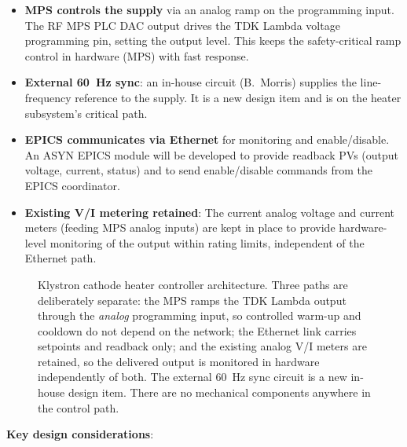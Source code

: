 \begin{itemize}
\tightlist
\item
  \textbf{MPS controls the supply} via an analog ramp on the programming input. The RF MPS PLC DAC output drives the TDK Lambda voltage programming pin, setting the output level. This keeps the safety-critical ramp control in hardware (MPS) with fast response.
\item
  \textbf{External \qty{60}{\hertz} sync}: an in-house circuit (B.~Morris) supplies the line-frequency reference to the supply. It is a new design item and is on the heater subsystem's critical path.
\item
  \textbf{EPICS communicates via Ethernet} for monitoring and enable/disable. An ASYN EPICS module will be developed to provide readback PVs (output voltage, current, status) and to send enable/disable commands from the EPICS coordinator.
\item
  \textbf{Existing V/I metering retained}: The current analog voltage and current meters (feeding MPS analog inputs) are kept in place to provide hardware-level monitoring of the output within rating limits, independent of the Ethernet path.
\end{itemize}

\begin{figure}[tbp]
\centering
\begin{fitpicture}\end{fitpicture}
\caption{Klystron cathode heater controller architecture.  Three paths are deliberately separate: the MPS ramps the TDK Lambda output through the \emph{analog} programming input, so controlled warm-up and cooldown do not depend on the network; the Ethernet link carries setpoints and readback only; and the existing analog V/I meters are retained, so the delivered output is monitored in hardware independently of both.  The external \qty{60}{\hertz} sync circuit is a new in-house design item.  There are no mechanical components anywhere in the control path.}\label{fig:heater-architecture}
\end{figure}
\textbf{Key design considerations}:

